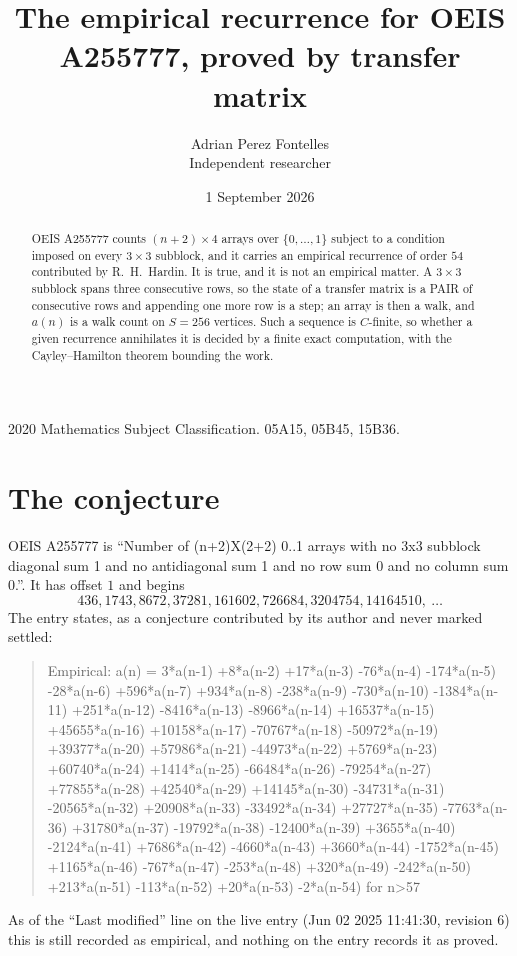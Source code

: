 \documentclass[11pt,a4paper]{article}
\title{The empirical recurrence for OEIS A255777, proved by transfer matrix}
\author{Adrian Perez Fontelles\\ \small Independent researcher}
\date{1 September 2026}
\theoremstyle{plain}
\theoremstyle{definition}
\begin{document}
\maketitle

\begin{abstract}
OEIS A255777 counts $(n+2)\times4$ arrays over $\{0,\dots,1\}$ subject to a condition imposed on
every $3\times3$ subblock, and it carries an empirical recurrence of order $54$
contributed by R.~H.~Hardin. It is true, and it is not an empirical matter. A $3\times3$
subblock spans three consecutive rows, so the state of a transfer matrix is a PAIR of
consecutive rows and appending one more row is a step; an array is then a walk, and
$a(n)$ is a walk count on $S=256$ vertices. Such a sequence is $C$-finite, so whether a given
recurrence annihilates it is decided by a finite exact computation, with the Cayley--Hamilton
theorem bounding the work.
\end{abstract}

\noindent\small 2020 Mathematics Subject Classification. 05A15, 05B45, 15B36.\normalsize

\section{The conjecture}

OEIS A255777 is ``Number of (n+2)X(2+2) 0..1 arrays with no 3x3 subblock diagonal sum 1 and no antidiagonal sum 1 and no row sum 0 and no column sum 0.''. It has offset $1$ and begins
\[
436, 1743, 8672, 37281, 161602, 726684, 3204754, 14164510,\ \dots
\]
The entry states, as a conjecture contributed by its author and never marked settled:
\begin{quote}
Empirical: a(n) = 3*a(n-1) +8*a(n-2) +17*a(n-3) -76*a(n-4) -174*a(n-5) -28*a(n-6) +596*a(n-7) +934*a(n-8) -238*a(n-9) -730*a(n-10) -1384*a(n-11) +251*a(n-12) -8416*a(n-13) -8966*a(n-14) +16537*a(n-15) +45655*a(n-16) +10158*a(n-17) -70767*a(n-18) -50972*a(n-19) +39377*a(n-20) +57986*a(n-21) -44973*a(n-22) +5769*a(n-23) +60740*a(n-24) +1414*a(n-25) -66484*a(n-26) -79254*a(n-27) +77855*a(n-28) +42540*a(n-29) +14145*a(n-30) -34731*a(n-31) -20565*a(n-32) +20908*a(n-33) -33492*a(n-34) +27727*a(n-35) -7763*a(n-36) +31780*a(n-37) -19792*a(n-38) -12400*a(n-39) +3655*a(n-40) -2124*a(n-41) +7686*a(n-42) -4660*a(n-43) +3660*a(n-44) -1752*a(n-45) +1165*a(n-46) -767*a(n-47) -253*a(n-48) +320*a(n-49) -242*a(n-50) +213*a(n-51) -113*a(n-52) +20*a(n-53) -2*a(n-54) for n>57
\end{quote}
As of the ``Last modified'' line on the live entry (Jun 02 2025 11:41:30, revision 6) this is still
recorded as empirical, and nothing on the entry records it as proved.
\end{document}
